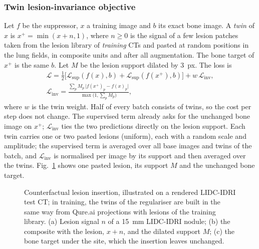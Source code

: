 \subsubsection{Twin lesion-invariance objective}
\label{sec:m-twin}
Let $f$ be the suppressor, $x$ a training image and $b$ its exact bone image. A \emph{twin} of $x$ is $x^{+}=\min(x+n,1)$, where $n\ge0$ is
the signal of a few lesion patches taken from the lesion library of \emph{training} CTs and pasted at random positions in the lung fields,
in composite units and after all augmentation. The bone target of $x^{+}$ is the same $b$. Let $M$ be the lesion support dilated by
$3$~px. The loss is
\begin{equation}
\begin{gathered}
\mathcal{L}=\tfrac12\big[\mathcal{L}_{\mathrm{sup}}(f(x),b)+\mathcal{L}_{\mathrm{sup}}(f(x^{+}),b)\big]+w\,\mathcal{L}_{\mathrm{inv}},\\
\mathcal{L}_{\mathrm{inv}}=\frac{\sum_p M_p\,\big|f(x^{+})_p-f(x)_p\big|}{\max\big(1,\sum_p M_p\big)},
\end{gathered}
\label{eq:twin}
\end{equation}
where $w$ is the twin weight. Half of every batch consists of twins, so the cost per step does not change. The supervised term already asks
for the unchanged bone image on $x^{+}$; $\mathcal{L}_{\mathrm{inv}}$ ties the two predictions directly on the lesion support. Each twin
carries one or two pasted lesions (uniform), each with a random scale and amplitude; the supervised term is averaged over all base images
and twins of the batch, and $\mathcal{L}_{\mathrm{inv}}$ is normalised per image by its support and then averaged over the twins.
Fig.~\ref{fig:insertion} shows one pasted lesion, its support $M$ and the unchanged bone target.

\begin{figure}[!t]
\centering
{}
\caption{Counterfactual lesion insertion, illustrated on a rendered LIDC-IDRI test CT; in training, the twins of the regulariser are built
in the same way from Qure.ai projections with lesions of the training library. (a) Lesion signal $n$ of a 15~mm LIDC-IDRI nodule; (b) the
composite with the lesion, $x+n$, and the dilated support $M$; (c) the bone target under the site, which the insertion leaves unchanged.}
\label{fig:insertion}
\end{figure}

